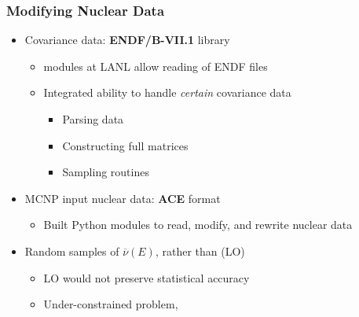 \begin{frame}
\frametitle{Modifying Nuclear Data}
\pause
\begin{itemize}
	\item<2-> Covariance data: \textbf{ENDF/B-VII.1} library
	\begin{itemize}
			\item<3->  modules at LANL allow reading of ENDF files
			\item<4-> Integrated ability to handle \emph{certain} covariance data
			   \begin{itemize}
				\setlength{\itemsep}{0in}
			     \item<5-> Parsing data
				\vspace{-0.08in}
			    	\item<6-> Constructing full matrices
				\vspace{-0.08in}
				\item<7-> Sampling routines
			\end{itemize}
	\end{itemize} 
 	\item<2-> MCNP input nuclear data: \textbf{ACE} format
	\begin{itemize}
  	\item<8-> Built Python modules to read, modify, and rewrite nuclear data
	\end{itemize}
	\item<9-> Random samples of $\overline{\nu}(E)$, rather than  (LO)
	\begin{itemize}
		\item<10-> LO would not preserve statistical accuracy
	  \item<10-> Under-constrained problem, 
\end{itemize} 
\end{itemize} 
\end{frame}

